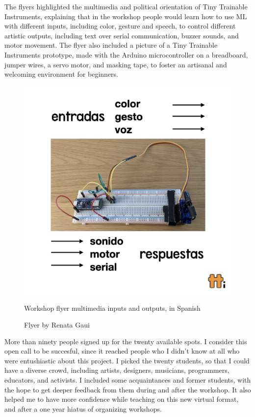 The flyers highlighted the multimedia and political orientation of Tiny Trainable Instruments, explaining that in the workshop people would learn how to use \acrshort{ML} with different inputs, including color, gesture and speech, to control different artistic outputs, including text over serial communication, buzzer sounds, and motor movement. The flyer also included a picture of a Tiny Trainable Instruments prototype, made with the Arduino microcontroller on a breadboard, jumper wires, a servo motor, and masking tape, to foster an artisanal and welcoming environment for beginners.


\begin{figure}[ht]
  \centering
  \includegraphics[width=0.75\linewidth,height=0.35\textheight,keepaspectratio]{images/workshop-es-2.jpg}
  \caption{Workshop flyer multimedia inputs and outputs, in Spanish}
  \caption*{Flyer by Renata Gaui}
  \label{fig:workshop-spanish-flyer-page-2}
\end{figure}

More than ninety people signed up for the twenty available spots. I consider this open call to be succesful, since it reached people who I didn't know at all who were entushiastic about this project. I picked the twenty students, so that I could have a diverse crowd, including artists, designers, musicians, programmers, educators, and activists. I included some acquaintances and former students, with the hope to get deeper feedback from them during and after the workshop. It also helped me to have more confidence while teaching on this new virtual format, and after a one year hiatus of organizing workshops.

